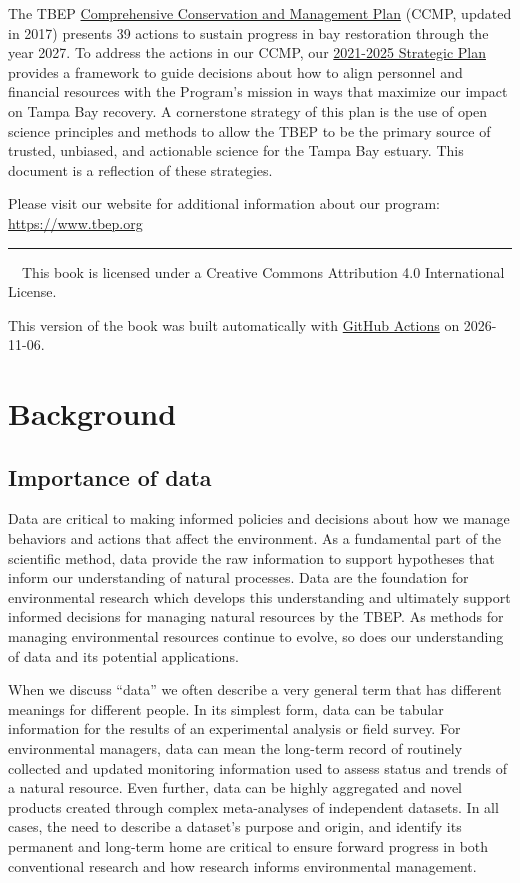 \documentclass[
]{book}
\begin{document}
The TBEP \href{http://ccmp.tbep.org/}{Comprehensive Conservation and Management Plan} (CCMP, updated in 2017) presents 39 actions to sustain progress in bay restoration through the year 2027. To address the actions in our CCMP, our \href{https://drive.google.com/file/d/11xohuoaHDxNHRqgXoOHdI37FpWvac_rn/view}{2021-2025 Strategic Plan} provides a framework to guide decisions about how to align personnel and financial resources with the Program's mission in ways that maximize our impact on Tampa Bay recovery. A cornerstone strategy of this plan is the use of open science principles and methods to allow the TBEP to be the primary source of trusted, unbiased, and actionable science for the Tampa Bay estuary. This document is a reflection of these strategies.

Please visit our website for additional information about our program: \url{https://www.tbep.org}

\begin{center}\rule{0.5\linewidth}{0.5pt}\end{center}

~~This book is licensed under a Creative Commons Attribution 4.0 International License.

This version of the book was built automatically with \href{https://github.com/tbep-tech/data-management-sop/actions}{GitHub Actions} on 2026-11-06.

\chapter{Background}\label{background}

\section{Importance of data}\label{dataimp}

Data are critical to making informed policies and decisions about how we manage behaviors and actions that affect the environment. As a fundamental part of the scientific method, data provide the raw information to support hypotheses that inform our understanding of natural processes. Data are the foundation for environmental research which develops this understanding and ultimately support informed decisions for managing natural resources by the TBEP. As methods for managing environmental resources continue to evolve, so does our understanding of data and its potential applications.

When we discuss ``data'' we often describe a very general term that has different meanings for different people. In its simplest form, data can be tabular information for the results of an experimental analysis or field survey. For environmental managers, data can mean the long-term record of routinely collected and updated monitoring information used to assess status and trends of a natural resource. Even further, data can be highly aggregated and novel products created through complex meta-analyses of independent datasets. In all cases, the need to describe a dataset's purpose and origin, and identify its permanent and long-term home are critical to ensure forward progress in both conventional research and how research informs environmental management.
\end{document}
